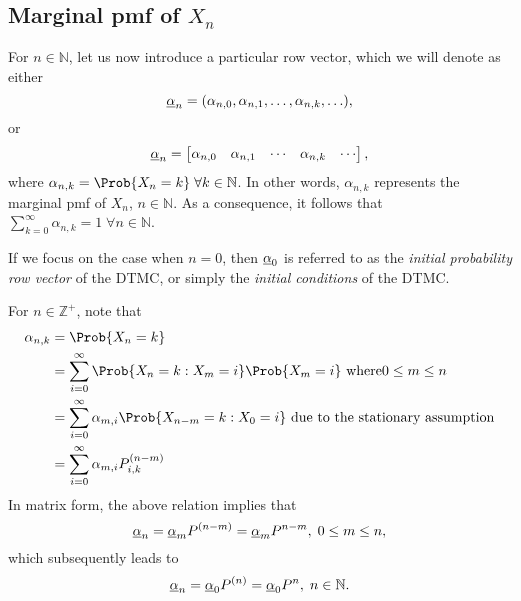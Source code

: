 \subsection*{Marginal pmf of $ X_n $}
\begin{Regular}
    For $ n\in\mathbb{N} $, let us now introduce a particular row vector, which we will denote as either
    \[ \underline{\alpha}_n=(\alpha_{n,0},\alpha_{n,1},\ldots,\alpha_{n,k},\ldots), \]
    or
    \[ \underline{\alpha}_n=\begin{bmatrix}
            \alpha_{n,0} & \alpha_{n,1} & \cdots & \alpha_{n,k} & \cdots
        \end{bmatrix}, \]
    where $ \alpha_{n,k}=\Prob{X_n=k}\; \forall k\in\mathbb{N} $. In other words, $ \alpha_{n,k} $ represents the marginal pmf of $ X_n $,
    $ n\in\mathbb{N} $. As a consequence, it follows that $ \sum_{k=0}^{\infty} \alpha_{n,k}=1\;\forall n\in\mathbb{N} $.

    If we focus on the case when $ n=0 $, then $ \underline{\alpha}_0 $ is referred to as the \emph{initial probability row vector}
    of the DTMC, or simply the \emph{initial conditions} of the DTMC\@.

    For $ n\in\mathbb{Z}^+ $, note that
    \begin{align*}
        \alpha_{n, k} & =\Prob{X_{n}=k}                                                                                            \\
                      & =\sum_{i=0}^{\infty} \Prob{X_{n}=k \given X_{m}=i} \Prob{X_{m}=i} \text{ where} 0 \leq m \leq n            \\
                      & =\sum_{i=0}^{\infty} \alpha_{m,i} \Prob{X_{n-m}=k \given X_{0}=i} \text{ due to the stationary assumption} \\
                      & =\sum_{i=0}^{\infty} \alpha_{m,i} P_{i,k}^{(n-m)}
    \end{align*}
    In matrix form, the above relation implies that
    \[ \underline{\alpha}_{n}=\underline{\alpha}_{m} P^{(n-m)}=\underline{\alpha}_{m} P^{n-m},\; 0 \leq m \leq n, \]
    which subsequently leads to
    \[ \underline{\alpha}_n=\underline{\alpha}_0P^{(n)}=\underline{\alpha}_0P^{n},\; n\in\mathbb{N}. \]
\end{Regular}
